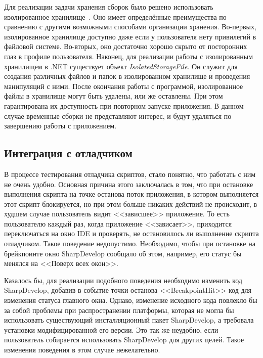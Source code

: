 Для реализации задачи хранения сборок было решено использовать изолированное хранилище~\cite{cs2010-dotnet40}. Оно имеет определённые преимущества по сравнению с другими возможными способами организации хранения. Во-первых, изолированное хранилище доступно даже если у пользователя нету привилегий в файловой системе. Во-вторых, оно достаточно хорошо скрыто от посторонних глаз в профиле пользователя. Наконец, для реализации работы с изолированным хранилищем в .NET существует объект {\it IsolatedStorageFile}. Он служит для создания различных файлов и папок в изолированном хранилище и проведения манипуляций с ними. После окончания работы с программой, изолированное файлы в хранилище могут быть удалены, или же оставлены. При этом гарантирована их доступность при повторном запуске приложения. В данном случае временные сборки не представляют интерес, и будут удаляться по завершению работы с приложением.

 
\subsection{Интеграция с отладчиком}
\label{sec:sd_debug}

В процессе тестирования отладчика скриптов, стало понятно, что работать с ним не очень удобно. Основная причина этого заключалась в том, что при остановке выполнения скрипта на точке останова поток приложения, в котором выполняется этот скрипт блокируется, но при этом больше никаких действий не происходит, в худшем случае пользователь видит <<зависшее>> приложение. То есть пользователю каждый раз, когда приложение <<зависает>>, приходится переключаться на окно IDE и проверять, не остановилось ли выполнение скрипта отладчиком. Такое поведение недопустимо. Необходимо, чтобы при остановке на брейкпоинте окно SharpDevelop сообщало об этом, например, его статус бы менялся на <<Поверх всех окон>>.

Казалось бы, для реализации подобного поведения необходимо изменить код SharpDevelop, добавив в событие точки останова <<BreakpointHit>> код для изменения статуса главного окна. Однако, изменение исходного кода повлекло бы за собой проблемы при распространении платформы, которая не могла бы использовать существующий инсталляционный пакет SharpDevelop, а требовала установки модифицированной его версии. Это так же неудобно, если пользователь собирается использовать SharpDevelop для других целей. Такое изменения поведения в этом случае нежелательно.

